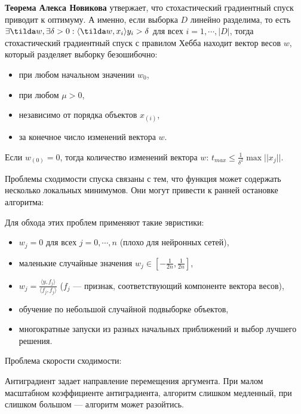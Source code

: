 \textbf{Теорема Алекса Новикова} утвержает, что стохастический градиентный
спуск приводит к оптимуму. А именно, если выборка $D$ линейно разделима, то
есть $\exists \tilda w, \exists \delta > 0 : \langle \tilda w, x_i \rangle y_i
> \delta$ для всех $i = 1, \cdots, |D|$, тогда стохастический градиентный спуск
с правилом Хебба находит вектор весов $w$, который разделяет выборку безошибочно:
\begin{itemize}
    \item при любом начальном значении $w_0$,
    \item при любом $\mu > 0$,
    \item независимо от порядка объектов $x_{(i)}$,
    \item за конечное число изменений вектора $w$.
\end{itemize}
Если $w_{(0)} = 0$, тогда количество изменений вектора $w$: $t_{max} \leq
\frac{1}{\delta^2} \max ||x_j||$.

Проблемы сходимости спуска связаны с тем, что функция может содержать несколько
локальных минимумов. Они могут привести к ранней остановке алгоритма: 


Для обхода этих проблем применяют такие эвристики:

\begin{itemize}
    \item $w_j = 0$ для всех $j = 0, \cdots, n$ (плохо для нейронных сетей),

    \item маленькие случайные значения $w_j \in \left[ -\frac{1}{2n},
        \frac{1}{2n} \right]$,

    \item $w_j = \frac{\langle y, f_j \rangle}{\langle f_j, f_j \rangle}$
        ($f_j$
        --- признак, соответствующий компоненте вектора весов),

    \item обучение по небольшой случайной подвыборке объектов,

    \item многократные запуски из разных начальных приближений и выбор лучшего
        решения.
\end{itemize}

Проблема скорости сходимости:


Антиградиент задает направление перемещения аргумента. При малом масштабном
коэффициенте антиградиента, алгоритм слишком медленный, при слишком большом ---
алгоритм может разойтись.

